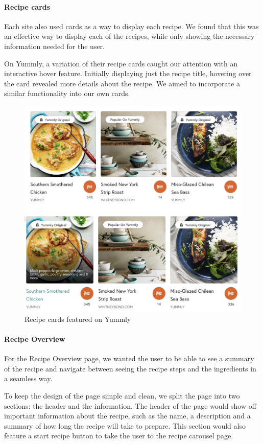 \documentclass{article}
\begin{document}
\paragraph{Recipe cards}
Each site also used cards as a way to display each recipe. We found that this
was an effective way to display each of the recipes, while only showing the
necessary information needed for the user.

On Yummly, a variation of their recipe cards caught our attention with an
interactive hover feature. Initially displaying just the recipe title, hovering
over the card revealed more details about the recipe. We aimed to incorporate a
similar functionality into our own cards.

\begin{figure}[h]
  \includegraphics[width=1.0\textwidth]{assets/design-images/Yummly recipe cards.png}
  \centering
  \caption{Recipe cards featured on Yummly}
\end{figure}

\paragraph{Recipe Overview}
For the Recipe Overview page, we wanted the user to be able to see a summary of
the recipe and navigate between seeing the recipe steps and the ingredients in
a seamless way.

To keep the design of the page simple and clean, we split the page into two
sections: the header and the information. The header of the page would show off
important information about the recipe, such as the name, a description and a
summary of how long the recipe will take to prepare. This section would also
feature a start recipe button to take the user to the recipe carousel page.
\end{document}
